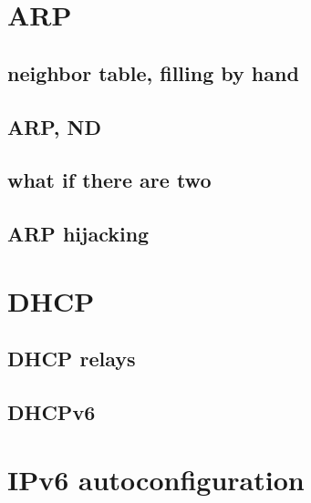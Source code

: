 \section{ARP}

\subsection{neighbor table, filling by hand}


\subsection{ARP, ND}



\subsection{what if there are two}



\subsection{ARP hijacking}




\section{DHCP}


\subsection{DHCP relays}


\subsection{DHCPv6}


\section{IPv6 autoconfiguration}


